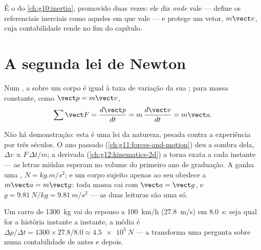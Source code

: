 \begin{remark}\label{rem:g12:newtons-laws:sharpened}
É o  do \cref{ch:g10:inertia}, promovido duas vezes: ele diz
\emph{onde} vale --- define os referenciais inerciais como aqueles em que vale --- e
protege um vetor, $m\vect v$, cuja contabilidade rende no fim do capítulo.
\end{remark}

\section{A segunda lei de Newton}

\begin{theorem}\label{thm:g12:newtons-laws:second}
Num , a  sobre um corpo é igual à taxa de
variação da sua ; para massa constante, como
$\vect p = m\vect v$,
\[
\sum \vect F = \frac{d\vect p}{dt} = m\,\frac{d\vect v}{dt} = m \vect a .
\]
\end{theorem}
\admitted

\begin{remark}\label{rem:g12:newtons-laws:nature}
Não há demonstração: esta é uma lei da natureza, pesada contra a experiência por três
séculos. O ano passado (\cref{ch:g11:forces-and-motion}) deu a sombra dela,
$\Delta v \propto F\,\Delta t/m$; a derivada (\cref{ch:g12:kinematics-2d}) a torna
exata a cada instante --- as letras miúdas esperam no volume do primeiro ano de
graduação. A  ganha uma , $\unit{N} = \unit{kg.m/s^2}$; e um corpo sujeito
apenas ao seu  obedece a $m\vect a = m\vect g$: toda massa cai com
$\vect a = \vect g$, e $g = \qty{9.81}{N/kg} = \qty{9.81}{m/s^2}$ --- as duas leituras
são uma só.
\end{remark}

\begin{example}\label{ex:g12:newtons-laws:average}
Um carro de \qty{1300}{kg} vai do repouso a \qty{100}{km/h} (\qty{27.8}{m/s}) em
\qty{8.0}{s}: seja qual for a história instante a instante, a  média é
$\Delta p/\Delta t = 1300 \times 27.8/8.0 \approx \qty{4.5e3}{N}$ --- a  transforma uma pergunta sobre  numa contabilidade de antes e depois.
\end{example}


